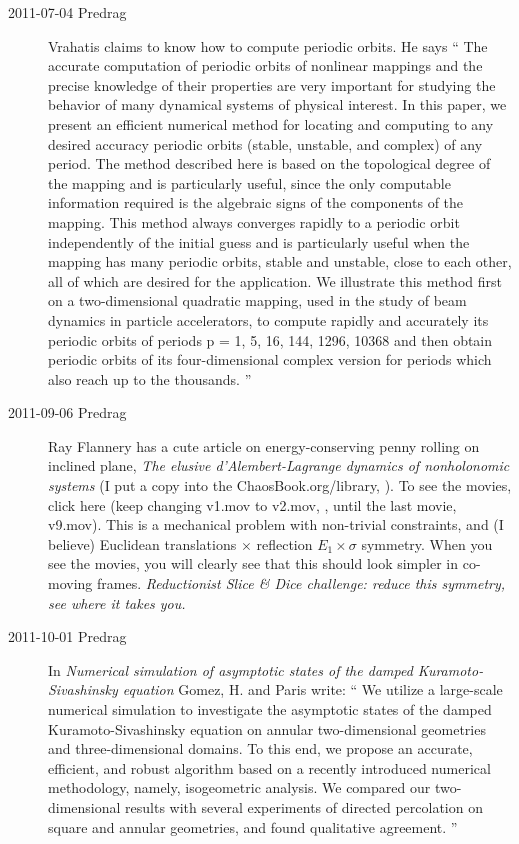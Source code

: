 \begin{description}
\item[2011-07-04 Predrag]
Vrahatis claims to know how to compute periodic orbits. He says
``
The accurate computation of periodic orbits of nonlinear mappings and the
precise knowledge of their properties are very important for studying the
behavior of many dynamical systems of physical interest. In this paper,
we present an efficient numerical method for locating and computing to
any desired accuracy periodic orbits (stable, unstable, and complex) of
any period. The method described here is based on the topological degree
of the mapping and is particularly useful, since the only computable
information required is the algebraic signs of the components of the
mapping. This method always converges rapidly to a periodic orbit
independently of the initial guess and is particularly useful when the
mapping has many periodic orbits, stable and unstable, close to each
other, all of which are desired for the application. We illustrate this
method first on a two-dimensional quadratic mapping, used in the study of
beam dynamics in particle accelerators, to compute rapidly and accurately
its periodic orbits of periods p = 1, 5, 16, 144, 1296, 10368 and then
obtain periodic orbits of its four-dimensional complex version for
periods which also reach up to the thousands.
''

\item[2011-09-06 Predrag]
Ray Flannery
has a cute article on energy-\-conserving penny rolling on inclined
plane,
{\em The elusive {d'Alembert-Lagrange} dynamics of nonholonomic systems}
(I put a copy into the
ChaosBook.org/library,
).
To see the movies,
{click here}
(keep changing v1.mov to v2.mov, \etc, until the last movie,
{v9.mov}).
This is a mechanical problem with non-trivial constraints,
and (I believe) Euclidean translations $\times$ reflection
$E_1 \times \sigma$ symmetry. When you see the movies,
you will clearly see that this should look simpler in co-moving frames.
\emph{
Reductionist
Slice \& Dice challenge: reduce this symmetry, see where it takes you.
}

\item[2011-10-01 Predrag]
In {\em Numerical simulation of asymptotic states of the damped
            {Kuramoto-Sivashinsky} equation}
Gomez, H. and Paris write: ``
We utilize a large-scale numerical simulation to investigate the
asymptotic states of the damped Kuramoto-Sivashinsky equation on annular
two-dimensional geometries and three-dimensional domains. To this end, we
propose an accurate, efficient, and robust algorithm based on a recently
introduced numerical methodology, namely, isogeometric analysis. We
compared our two-dimensional results with several experiments of directed
percolation on square and annular geometries, and found qualitative
agreement.
''


\end{description}
